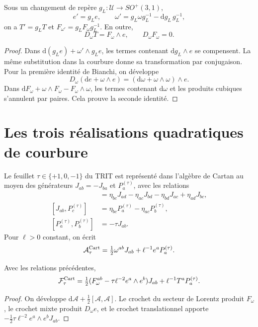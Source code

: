 \begin{proposition}
\label{x_reciprocidad:vii:prop:bianchi-cartan}
Sous un changement de repère \(g_L:\mathcal U\to SO^+(3,1)\),
\[
 e'=g_Le,\qquad
 \omega'=g_L\omega g_L^{-1}-\mathrm dg_L\,g_L^{-1},
\]
on a \(T'=g_LT\) et \(F_{\omega'}=g_LF_\omega g_L^{-1}\). En outre,
\begin{equation}
 D_\omega T=F_\omega\wedge e,\qquad D_\omega F_\omega=0.
 \label{x_reciprocidad:vii:eq:bianchi-realizacion}
\end{equation}
\end{proposition}
\begin{proof}
Dans \(\mathrm d(g_Le)+\omega'\wedge g_Le\), les termes
contenant \(\mathrm dg_L\wedge e\) se compensent.
La même substitution dans la courbure donne sa transformation par
conjugaison. Pour la première identité de Bianchi, on développe
\[
 D_\omega(\mathrm de+\omega\wedge e)
 =(\mathrm d\omega+\omega\wedge\omega)\wedge e.
\]
Dans \(\mathrm dF_\omega+\omega\wedge F_\omega-F_\omega\wedge\omega\), les termes contenant \(\mathrm d\omega\) et les produits cubiques s'annulent par paires. Cela prouve la seconde identité.
\end{proof}

\section{Les trois réalisations quadratiques de courbure}

Le feuillet \(\tau\in\{+1,0,-1\}\) du TRIT est représenté dans
l'algèbre de Cartan au moyen des générateurs \(J_{ab}=-J_{ba}\)
et \(P_a^{(\tau)}\), avec les relations
\begin{align*}
 [J_{ab},J_{cd}]&=
 \eta_{bc}J_{ad}-\eta_{ac}J_{bd}
 -\eta_{bd}J_{ac}+\eta_{ad}J_{bc},\\
 [J_{ab},P_c^{(\tau)}]&=
 \eta_{bc}P_a^{(\tau)}-\eta_{ac}P_b^{(\tau)},\\
 [P_a^{(\tau)},P_b^{(\tau)}]&=-\tau J_{ab}.
\end{align*}
Pour \(\ell>0\) constant, on écrit
\[
 \mathcal A_\tau^{\rm Cart}
 =\tfrac12\omega^{ab}J_{ab}+\ell^{-1}e^aP_a^{(\tau)}.
\]

\begin{proposition}
\label{x_reciprocidad:vii:prop:curvatura-tritificada}
Avec les relations précédentes,
\begin{equation}
 \mathcal F_\tau^{\rm Cart}
 =\tfrac12(F_\omega^{ab}-\tau\ell^{-2}e^a\wedge e^b)J_{ab}
     +\ell^{-1}T^aP_a^{(\tau)}.
 \label{x_reciprocidad:vii:eq:curvatura-tritificada}
\end{equation}
\end{proposition}
\begin{proof}
On développe \(\mathrm d\mathcal A+\tfrac12[\mathcal A,\mathcal A]\). Le crochet du secteur de Lorentz produit \(F_\omega\), le crochet mixte produit \(D_\omega e\), et le crochet translationnel apporte \(-\tfrac12\tau\ell^{-2}e^a\wedge e^bJ_{ab}\).
\end{proof}

